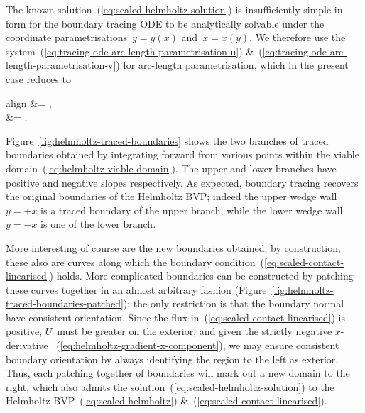 The known solution~(\ref{eq:scaled-helmholtz-solution})
is insufficiently simple in form
for the boundary tracing ODE to be analytically solvable
under the coordinate parametrisations~$y = y (x)$ and~$x = x (y)$.
We therefore use the system~(\ref{eq:tracing-ode-arc-length-parametrisation-u})
\&~(\ref{eq:tracing-ode-arc-length-parametrisation-v})
for arc-length parametrisation,
which in the present case reduces to
\begin{important}{align}
   &= ,
    \label{eq:helmholtz-tracing-ode-arc-length-parametrisation-x}
    \\[\tallspace]
   &= .
    \label{eq:helmholtz-tracing-ode-arc-length-parametrisation-y}
\end{important}
Figure~\ref{fig:helmholtz-traced-boundaries}
shows the two branches of traced boundaries obtained
by integrating forward from various points
within the viable domain~(\ref{eq:helmholtz-viable-domain}).
The upper and lower branches have positive and negative slopes respectively.
As expected,
boundary tracing recovers the original boundaries of the Helmholtz BVP\@;
indeed the upper wedge wall~$y = +x$ is a traced boundary of the upper branch,
while the lower wedge wall~$y = -x$ is one of the lower branch.

\begin{figure}
\end{figure}

More interesting of course are the new boundaries obtained;
by construction, these also are curves
along which the boundary condition~(\ref{eq:scaled-contact-linearised}) holds.
More complicated boundaries can be constructed
by patching these curves together in an almost arbitrary fashion
(Figure~\ref{fig:helmholtz-traced-boundaries-patched});
the only restriction is that the boundary normal
have consistent orientation.
Since the flux in~(\ref{eq:scaled-contact-linearised}) is positive,
$U$~must be greater on the exterior,
and given the strictly negative $x$-derivative~%
  (\ref{eq:helmholtz-gradient-x-component}),
we may ensure consistent boundary orientation
by always identifying the region to the left as exterior.
Thus, each patching together of boundaries
will mark out a new domain to the right,
which also admits the solution~(\ref{eq:scaled-helmholtz-solution})
to the Helmholtz BVP~(\ref{eq:scaled-helmholtz})
\&~(\ref{eq:scaled-contact-linearised}).

